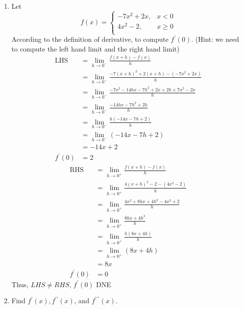 \documentclass{exam}
\def\ans#1{\hfill \textcolor{lightgray}{#1}}
\begin{document}
\begin{enumerate}
\item Let
\[
f(x)=\left\{
\begin{array}{ll}
      -7x^{2}+2x, & x<0 \\
      4x^{2}-2,& x\geq 0\\
\end{array} 
\right.
\]
According to the definition of derivative, to compute $f^{\prime}(0)$. (Hint: we need to compute the left hand limit and the right hand limit)
\begin{align*}
\text{LHS} & = \lim_{h\rightarrow 0^{-}}\frac{f(x+h)-f(x)}{h}\\
      & = \lim_{h\rightarrow 0^{-}}\frac{-7(x+h)^{2}+2(x+h)-(-7x^{2}+2x)}{h}\\
      & = \lim_{h\rightarrow 0^{-}}\frac{-7x^{2}-14hx-7h^{2}+2x+2h+7x^{2}-2x}{h}\\
      & = \lim_{h\rightarrow 0^{-}}\frac{-14hx-7h^{2}+2h}{h}\\
      & = \lim_{h\rightarrow 0^{-}}\frac{h(-14x-7h+2)}{h}\\
      & = \lim_{h\rightarrow 0^{-}}(-14x-7h+2)\\
      & = -14x+2 \\
f^{\prime}(0) & = 2
\end{align*}
\begin{align*}
\text{RHS} & = \lim_{h\rightarrow 0^{+}}\frac{f(x+h)-f(x)}{h}\\
      & = \lim_{h\rightarrow 0^{+}}\frac{4(x+h)^{2}-2-(4x^{2}-2)}{h}\\
      & = \lim_{h\rightarrow 0^{+}}\frac{4x^{2}+8hx+4h^{2}-4x^{2}+2}{h}\\
      & = \lim_{h\rightarrow 0^{+}}\frac{8hx+4h^{2}}{h}\\
      & = \lim_{h\rightarrow 0^{+}}\frac{h(8x+4h)}{h}\\
      & = \lim_{h\rightarrow 0^{+}}(8x+4h)\\
      & =8x\\
f^{\prime}(0) & = 0
\end{align*}
Thus, $LHS \neq RHS$, $f^{\prime}(0)$ DNE



\item
Find $f^{\prime}(x), f^{\prime\prime}(x)$, and $f^{\prime\prime\prime}(x)$.  %


\end{enumerate}
\end{document}
